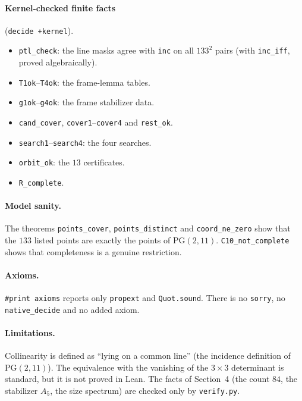 \documentclass[11pt]{article}
\theoremstyle{definition}
\theoremstyle{remark}
\newcommand{\PG}{\mathrm{PG}(2,11)}
\begin{document}
\paragraph{Kernel-checked finite facts} (\texttt{decide +kernel}).
\begin{itemize}
\item \texttt{ptl\_check}: the line masks agree with \texttt{inc} on all
$133^2$ pairs (with \texttt{inc\_iff}, proved algebraically).
\item \texttt{T1ok}--\texttt{T4ok}: the frame-lemma tables.
\item \texttt{g1ok}--\texttt{g4ok}: the frame stabilizer data.
\item \texttt{cand\_cover}, \texttt{cover1}--\texttt{cover4} and
\texttt{rest\_ok}.
\item \texttt{search1}--\texttt{search4}: the four searches.
\item \texttt{orbit\_ok}: the $13$ certificates.
\item \texttt{R\_complete}.
\end{itemize}

\paragraph{Model sanity.} The theorems \texttt{points\_cover},
\texttt{points\_distinct} and \texttt{coord\_ne\_zero} show that the $133$
listed points are exactly the points of $\PG$. \texttt{C10\_not\_complete}
shows that completeness is a genuine restriction.

\paragraph{Axioms.} \texttt{\#print axioms} reports only \texttt{propext} and
\texttt{Quot.sound}. There is no \texttt{sorry}, no \texttt{native\_decide} and
no added axiom.

\paragraph{Limitations.} Collinearity is defined as ``lying on a common line''
(the incidence definition of $\PG$). The equivalence with the vanishing of the
$3\times3$ determinant is standard, but it is not proved in Lean. The facts of
Section~4 (the count $84$, the stabilizer $A_5$, the size spectrum) are
checked only by \texttt{verify.py}.
\end{document}
